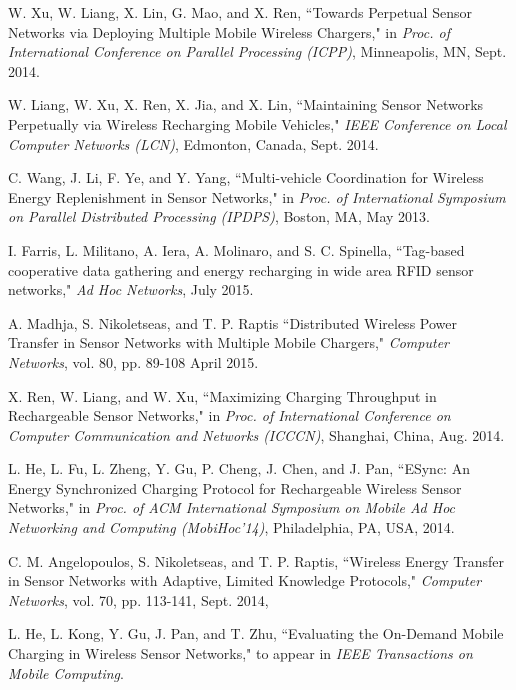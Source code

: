 \documentclass[twocolumn,10pt]{IEEEtran}
\begin{document}
\begin{thebibliography}{99}
W. Xu, W. Liang, X. Lin, G. Mao, and X. Ren, 
``Towards Perpetual Sensor Networks via Deploying Multiple Mobile Wireless Chargers," in \emph{Proc. of International Conference on
Parallel Processing (ICPP)}, Minneapolis, MN, Sept. 2014. 

W. Liang, W. Xu, X. Ren, X. Jia, and X. Lin, ``Maintaining Sensor Networks Perpetually via Wireless Recharging Mobile Vehicles," \emph{IEEE Conference on Local Computer Networks (LCN)}, Edmonton, Canada, Sept. 2014.


C. Wang,  J. Li,  F. Ye, and Y. Yang, ``Multi-vehicle Coordination for Wireless Energy Replenishment in Sensor Networks," in \emph{Proc. of International Symposium on  Parallel  Distributed Processing (IPDPS)}, Boston, MA, May 2013.  

I. Farris, L. Militano, A. Iera, A. Molinaro,  and S. C. Spinella, ``Tag-based cooperative data gathering and energy recharging in wide area RFID sensor networks," 
\emph{Ad Hoc Networks},  July 2015.



A. Madhja, S. Nikoletseas, and T. P. Raptis 
``Distributed Wireless Power Transfer in Sensor Networks with Multiple Mobile Chargers,"
\emph{Computer Networks}, vol. 80, pp. 89-108  April 2015.  

X. Ren, W. Liang, and W. Xu, ``Maximizing Charging Throughput in Rechargeable Sensor Networks," in \emph{Proc. of International Conference on Computer Communication and Networks (ICCCN)}, Shanghai, China, Aug. 2014. 

L. He, L. Fu, L. Zheng, Y. Gu, P. Cheng, J. Chen, and J. Pan,
``ESync: An Energy Synchronized Charging Protocol for Rechargeable Wireless Sensor Networks," in \emph{Proc. of ACM International Symposium on Mobile Ad Hoc Networking and Computing (MobiHoc'14)}, Philadelphia, PA, USA, 2014.

C. M. Angelopoulos, S. Nikoletseas, and T. P. Raptis, ``Wireless Energy Transfer in Sensor Networks with Adaptive, Limited Knowledge Protocols," \emph{Computer Networks}, vol. 70, pp. 113-141, Sept. 2014, 

 

L. He, L. Kong, Y. Gu, J. Pan, and T. Zhu, ``Evaluating the On-Demand Mobile Charging in Wireless Sensor Networks," to appear in \emph{IEEE Transactions on Mobile Computing}. 


\end{thebibliography}
\end{document}
